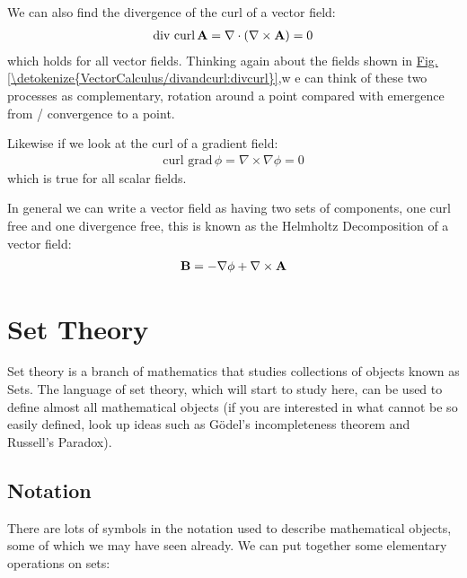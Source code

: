 \documentclass[letterpaper,10pt,english]{jupyterBook}
\begin{document}
\sphinxAtStartPar
We can also find the divergence of the curl of a vector field:
\begin{equation*}
\begin{split}\text{div}\,\,\text{curl}\,{\bf A} = \nabla \cdot (\nabla \times {\bf A}) = 0\end{split}
\end{equation*}
\sphinxAtStartPar
which holds for all vector fields.  Thinking again about the fields shown in \hyperref[\detokenize{VectorCalculus/divandcurl:divcurl}]{Fig.\@ \ref{\detokenize{VectorCalculus/divandcurl:divcurl}}},w e can think of these two processes as complementary,
rotation around a point compared with emergence from / convergence to a point.

\sphinxAtStartPar
Likewise if we look at the curl of a gradient field:
\begin{equation*}
\begin{split}\text{curl}\,\,\text{grad}\,\phi = \nabla \times \nabla \phi = 0\end{split}
\end{equation*}
\sphinxAtStartPar
which is true for all scalar fields.

\sphinxAtStartPar
In general we can write a vector field as having two sets of components, one curl free and one divergence free, this is known as the Helmholtz Decomposition of a vector field:
\begin{equation*}
\begin{split}{\bf B} = -\nabla \phi + \nabla \times {\bf A}\end{split}
\end{equation*}

\chapter{Set Theory}
\label{\detokenize{ProofLogic/setsnotation:set-theory}}\label{\detokenize{ProofLogic/setsnotation::doc}}
\sphinxAtStartPar
Set theory is a branch of mathematics that studies collections of objects known as Sets.  The language of set theory, which will start to study here, can be used
to define almost all mathematical objects (if you are interested in what cannot be so easily defined, look up ideas such as Gödel’s incompleteness theorem and Russell’s Paradox).


\section{Notation}
\label{\detokenize{ProofLogic/setsnotation:notation}}
\sphinxAtStartPar
There are lots of symbols in the notation used to describe mathematical objects, some of which we may have seen already.  We can put together some elementary operations on sets:
\end{document}
